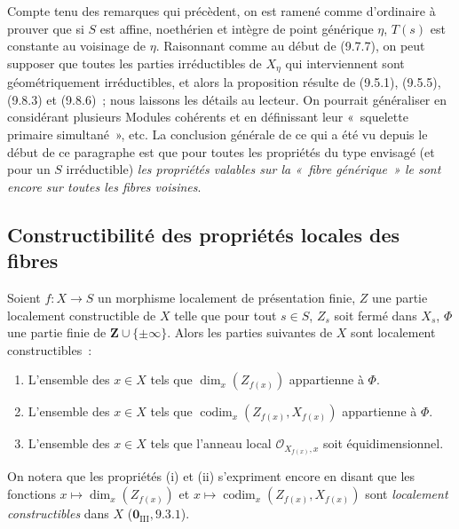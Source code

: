\begin{remark}[9.8.9]
Compte tenu des remarques qui précèdent, on est ramené comme d'ordinaire à
prouver que si $S$ est affine, noethérien et intègre de point générique $\eta$,
$T(s)$ est constante au voisinage de $\eta$. Raisonnant comme au début de
(9.7.7), on peut supposer que toutes les parties irréductibles de $X_\eta$ qui
interviennent sont géométriquement irréductibles, et alors la proposition
résulte de (9.5.1), (9.5.5), (9.8.3) et (9.8.6)~; nous laissons les détails au
lecteur. On pourrait généraliser en considérant plusieurs Modules cohérents et
en définissant leur «~squelette primaire simultané~», etc. La conclusion
générale de ce qui a été vu depuis le début de ce paragraphe est que pour toutes
les propriétés du type envisagé (et pour un $S$ irréductible) \emph{les
propriétés valables sur la «~fibre générique~» le sont encore sur toutes les
fibres voisines}.
\end{remark}

\subsection{Constructibilité des propriétés locales des fibres}
\label{subsection:IV.9.9-fr}

\begin{proposition}[9.9.1]
\label{IV.9.9.1-fr}
Soient $f:X\to S$ un morphisme localement de présentation finie, $Z$ une
partie localement constructible de $X$ telle que pour tout $s\in S$, $Z_s$ soit
fermé dans $X_s$, $\Phi$ une partie finie de $\mathbf Z\cup\{\pm\infty\}$.
Alors les parties suivantes de $X$ sont localement constructibles~:
\begin{enumerate}
\item[(i)] L'ensemble des $x\in X$ tels que
$\dim_x(Z_{f(x)})$ appartienne à $\Phi$.
\item[(ii)] L'ensemble des $x\in X$ tels que
$\operatorname{codim}_x(Z_{f(x)},X_{f(x)})$ appartienne à $\Phi$.
\item[(iii)] L'ensemble des $x\in X$ tels que l'anneau local
$\mathcal O_{X_{f(x)},x}$ soit équidimensionnel.
\end{enumerate}
\end{proposition}

On notera que les propriétés (i) et (ii) s'expriment encore en disant que les
fonctions $x\mapsto\dim_x(Z_{f(x)})$ et
$x\mapsto\operatorname{codim}_x(Z_{f(x)},X_{f(x)})$ sont
\emph{localement constructibles} dans $X$ ($\mathbf 0_{\mathrm{III}},9.3.1$).

